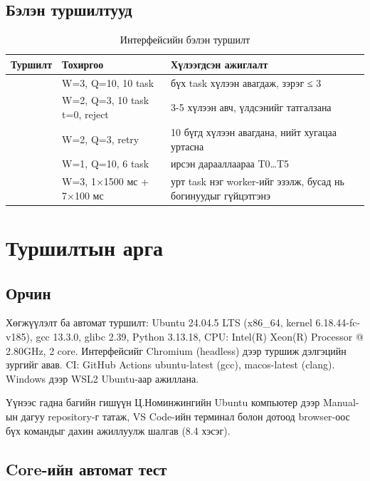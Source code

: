 \documentclass[12pt,a4paper]{article}
\begin{document}
\subsection{Бэлэн туршилтууд}

\begin{table}[H]
\centering
\caption{Интерфейсийн бэлэн туршилт}\label{tab:presets}
\begin{tabular}{|P{0.330}|P{0.300}|P{0.370}|}
\hline
{} \textbf{Туршилт} & \textbf{Тохиргоо} & \textbf{Хүлээгдсэн ажиглалт} \\ \hline
{} & W=3, Q=10, 10 task & бүх task хүлээн авагдаж, зэрэг ≤ 3 \\ \hline
{} & W=2, Q=3, 10 task t=0, reject & 3-5 хүлээн авч, үлдсэнийг татгалзана \\ \hline
{} & W=2, Q=3, retry & 10 бүгд хүлээн авагдана, нийт хугацаа уртасна \\ \hline
{} & W=1, Q=10, 6 task & ирсэн дарааллаараа T0…T5 \\ \hline
{} & W=3, 1×1500 мс + 7×100 мс & урт task нэг worker-ийг эзэлж, бусад нь богинуудыг гүйцэтгэнэ \\ \hline
\end{tabular}
\end{table}

\section{Туршилтын арга}

\subsection{Орчин}

Хөгжүүлэлт ба автомат туршилт: Ubuntu 24.04.5 LTS (x86\_64, kernel 6.18.44-fc-v185), gcc 13.3.0, glibc 2.39, Python 3.13.18, CPU: Intel(R) Xeon(R) Processor @ 2.80GHz, 2 core. Интерфейсийг Chromium (headless) дээр туршиж дэлгэцийн зургийг авав. CI: GitHub Actions ubuntu-latest (gcc), macos-latest (clang). Windows дээр WSL2 Ubuntu-аар ажиллана.

Үүнээс гадна багийн гишүүн Ц.Номинжингийн Ubuntu компьютер дээр Manual-ын дагуу repository-г татаж, VS Code-ийн терминал болон дотоод browser-оос бүх командыг дахин ажиллуулж шалгав (8.4 хэсэг).

\subsection{Core-ийн автомат тест}
\end{document}
